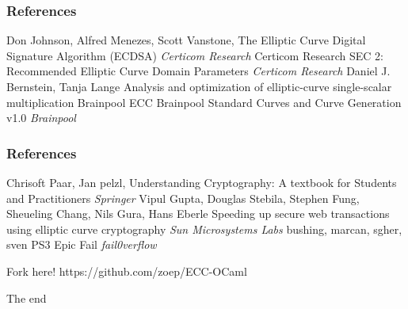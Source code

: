 \documentclass{beamer}
\begin{document}
\begin{frame}
\frametitle{References}
\footnotesize{
\begin{thebibliography}{99}
   Don Johnson, Alfred Menezes, Scott Vanstone,
 \newblock The Elliptic Curve Digital Signature Algorithm (ECDSA)
 \newblock \emph{Certicom Research}
   Certicom Research
 \newblock SEC 2: Recommended Elliptic Curve Domain Parameters
 \newblock \emph{Certicom Research}
    Daniel J. Bernstein, Tanja Lange
 \newblock Analysis and optimization of elliptic-curve single-scalar multiplication
   Brainpool
 \newblock ECC Brainpool Standard Curves and Curve Generation v1.0
 \newblock \emph{Brainpool}
\end{thebibliography}
}
\end{frame}
 
\begin{frame}
\frametitle{References}
\footnotesize{
\begin{thebibliography}{99}
    Chrisoft Paar, Jan pelzl,
 \newblock Understanding Cryptography: A textbook for Students and Practitioners
 \newblock \emph{Springer}
    Vipul Gupta, Douglas Stebila, Stephen Fung, Sheueling Chang, Nils Gura, Hans Eberle
 \newblock Speeding up secure web transactions using elliptic curve cryptography
 \newblock \emph{Sun Microsystems Labs}
     bushing, marcan, sgher, sven
 \newblock PS3 Epic Fail
 \newblock \emph{fail0verflow}
\end{thebibliography}
}
\end{frame}

 
\begin{frame}
\begin{block}
{Fork here!}
https://github.com/zoep/ECC-OCaml
\end{block}
\bigskip
\begin{block}
{The end}
\end{block}
\end{frame}
\end{document}
